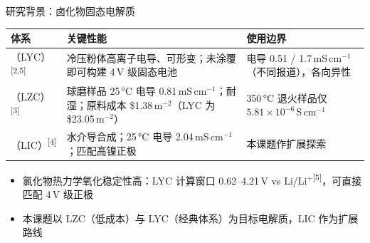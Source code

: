 \documentclass[aspectratio=169,10pt]{beamer}
\renewcommand{\cite}[1]{\textsuperscript{\color{NJUMuted}[#1]}}
\newenvironment{decktable}
  {\par\fontsize{8.3}{10.8}\selectfont\renewcommand{\arraystretch}{1.22}}
  {\par}
\begin{document}
\begin{frame}[t]{研究背景：卤化物固态电解质}
\begin{decktable}
\begin{tabular}{@{}L{.20\textwidth}L{.44\textwidth}L{.27\textwidth}@{}}
  \toprule
  体系 & 关键性能 & 使用边界 \\
  \midrule
  （LYC）\cite{2,5} & 冷压粉体高离子电导、可形变；未涂覆  即可构建 4\,V 级固态电池 & 电导 0.51 / 1.7\,mS\,cm$^{-1}$（不同报道），各向异性 \\
  （LZC）\cite{3} & 球磨样品 25\,°C 电导 0.81\,mS\,cm$^{-1}$；耐湿；原料成本 \$1.38\,m$^{-2}$（LYC 为 \$23.05\,m$^{-2}$） & 350\,°C 退火样品仅 $5.81\times10^{-6}$\,S\,cm$^{-1}$ \\
  （LIC）\cite{4} & 水介导合成；25\,°C 电导 2.04\,mS\,cm$^{-1}$；匹配高镍正极 & 本课题作扩展探索 \\
  \bottomrule
\end{tabular}
\end{decktable}

\begin{itemize}
  \item 氯化物热力学氧化稳定性高：LYC 计算窗口 0.62--4.21\,V vs Li/Li$^+$\cite{5}，可直接匹配 4\,V 级正极
  \item 本课题以 \alert{LZC}（低成本）与 \alert{LYC}（经典体系）为目标电解质，LIC 作为扩展路线
\end{itemize}
\end{frame}
\end{document}
